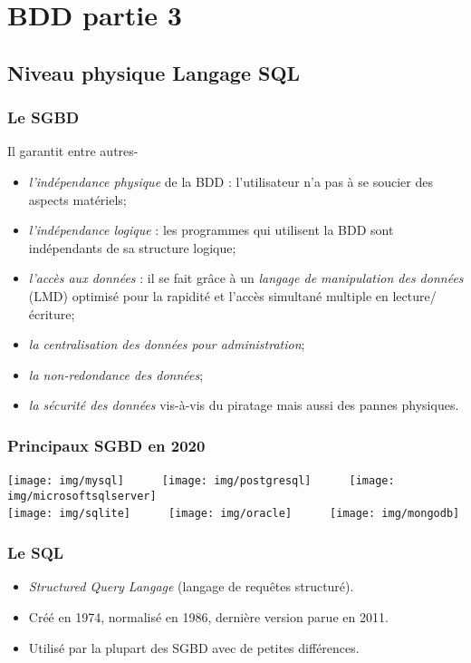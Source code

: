 \documentclass[10pt,cours,firamath]{nsi}
\begin{document}
\chapter{BDD partie 3}
\section{Niveau physique Langage SQL}
\subsection{Le SGBD}
Il garantit entre autres- 
\begin{itemize}
    \item	\textit{l'indépendance physique} de la BDD : l'utilisateur n'a pas à se soucier des aspects matériels;
    \item	\textit{l'indépendance logique} : les programmes qui utilisent la BDD sont indépendants de sa structure logique;
    \item 	\textit{l'accès aux données} : il se fait grâce à un \textit{langage de manipulation des données} (LMD) optimisé pour la rapidité et l'accès simultané multiple en lecture/écriture;
    \item 	\textit{la centralisation des données pour administration};
    \item 	\textit{la non-redondance des données};
    \item 	\textit{la sécurité des données} vis-à-vis du piratage mais aussi des pannes physiques.
\end{itemize}


\subsection{Principaux SGBD en 2020}
\texttt{[image: img/mysql]}\ \ \ \ \ \ \texttt{[image: img/postgresql]}\ \ \ \ \ \ \texttt{[image: img/microsoftsqlserver]}\\[2em]
\texttt{[image: img/sqlite]}\ \ \ \ \ \ \texttt{[image: img/oracle]}\ \ \ \ \ \ \texttt{[image: img/mongodb]}


\subsection{Le SQL}
\begin{itemize}
    \item	\textit{Structured Query Langage} (langage de requêtes structuré).
    \item	Créé en 1974, normalisé en 1986, dernière version parue en 2011.
    \item 	Utilisé par la plupart des SGBD avec de petites différences.
\end{itemize}
\end{document}
